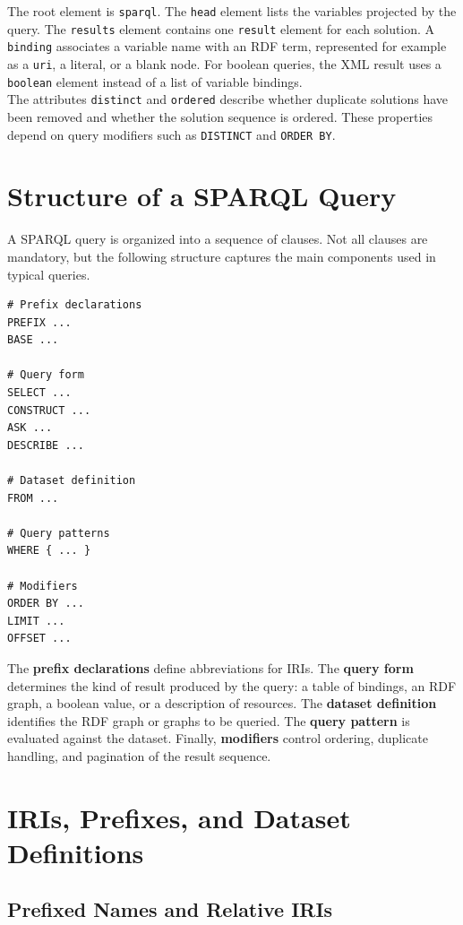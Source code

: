 \documentclass{scrbook}
\begin{document}
	The root element is \texttt{sparql}. The \texttt{head} element lists the variables projected by the query. The \texttt{results} element contains one \texttt{result} element for each solution. A \texttt{binding} associates a variable name with an RDF term, represented for example as a \texttt{uri}, a literal, or a blank node. For boolean queries, the XML result uses a \texttt{boolean} element instead of a list of variable bindings.\\
	
	The attributes \texttt{distinct} and \texttt{ordered} describe whether duplicate solutions have been removed and whether the solution sequence is ordered. These properties depend on query modifiers such as \texttt{DISTINCT} and \texttt{ORDER BY}.
	
	\section{Structure of a SPARQL Query}
	
	A SPARQL query is organized into a sequence of clauses. Not all clauses are mandatory, but the following structure captures the main components used in typical queries.
	
	\begin{lstlisting}
# Prefix declarations
PREFIX ...
BASE ...
	
# Query form
SELECT ...
CONSTRUCT ...
ASK ...
DESCRIBE ...
	
# Dataset definition
FROM ...
	
# Query patterns
WHERE { ... }
	
# Modifiers
ORDER BY ...
LIMIT ...
OFFSET ...
	\end{lstlisting}
	
	The \textbf{prefix declarations} define abbreviations for IRIs. The \textbf{query form} determines the kind of result produced by the query: a table of bindings, an RDF graph, a boolean value, or a description of resources. The \textbf{dataset definition} identifies the RDF graph or graphs to be queried. The \textbf{query pattern} is evaluated against the dataset. Finally, \textbf{modifiers} control ordering, duplicate handling, and pagination of the result sequence.
	
	\section{IRIs, Prefixes, and Dataset Definitions}
	
	\subsection{Prefixed Names and Relative IRIs}
	
\end{document}
